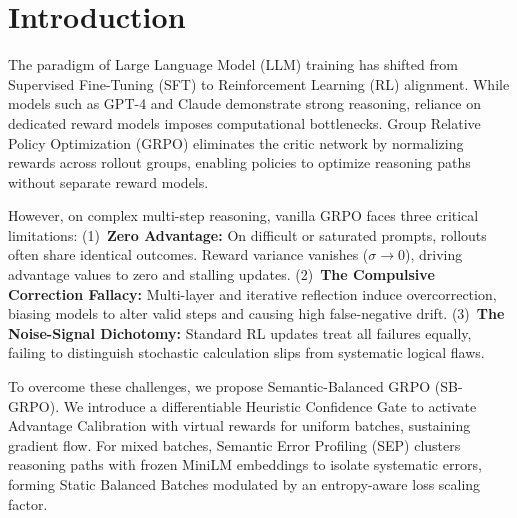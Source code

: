 \section{Introduction}

The paradigm of Large Language Model (LLM) training has shifted from Supervised Fine-Tuning (SFT) \cite{ouyang2022traininglanguagemodelsfollow} to Reinforcement Learning (RL) \cite{Fran_ois_Lavet_2018} alignment. While models such as GPT-4 \cite{Achiam2023GPT4TR} and Claude \cite{TheC3} demonstrate strong reasoning, reliance on dedicated reward models imposes computational bottlenecks. Group Relative Policy Optimization (GRPO) \cite{Guo_2025,shao2024deepseekmathpushinglimitsmathematical} eliminates the critic network by normalizing rewards across rollout groups, enabling policies to optimize reasoning paths without separate reward models.

However, on complex multi-step reasoning, vanilla GRPO faces three critical limitations:
(1)~\textbf{Zero Advantage:} On difficult or saturated prompts, rollouts often share identical outcomes. Reward variance vanishes ($\sigma \to 0$), driving advantage values to zero \cite{zhang2026trainlesslearnmore} and stalling updates.
(2)~\textbf{The Compulsive Correction Fallacy:} Multi-layer \cite{ding2025multilayergrpoenhancingreasoning} and iterative reflection \cite{madaan2023selfrefineiterativerefinementselffeedback} induce overcorrection, biasing models to alter valid steps and causing high false-negative drift.
(3)~\textbf{The Noise-Signal Dichotomy:} Standard RL updates treat all failures equally, failing to distinguish stochastic calculation slips from systematic logical flaws.

To overcome these challenges, we propose Semantic-Balanced GRPO (SB-GRPO). We introduce a differentiable Heuristic Confidence Gate to activate Advantage Calibration \cite{nan2025ngrponegativeenhancedgrouprelative} with virtual rewards for uniform batches, sustaining gradient flow. For mixed batches, Semantic Error Profiling (SEP) clusters reasoning paths with frozen MiniLM embeddings to isolate systematic errors, forming Static Balanced Batches modulated by an entropy-aware loss scaling factor.